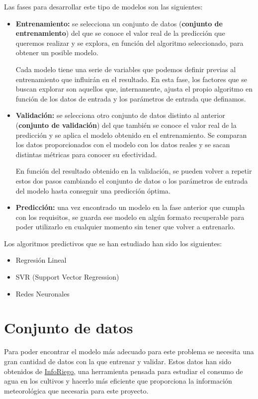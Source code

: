 Las fases para desarrollar este tipo de modelos son las siguientes:
\begin{itemize}
\item \textbf{Entrenamiento:} se selecciona un conjunto de datos (\textbf{conjunto de entrenamiento}) del que se conoce el valor real de la predicción que queremos realizar y se explora, en función del algoritmo seleccionado, para obtener un posible modelo.

Cada modelo tiene una serie de variables que podemos definir previas al entrenamiento que influirán en el resultado. En esta fase, los factores que se buscan explorar son aquellos que, internamente, ajusta el propio algoritmo en función de los datos de entrada y los parámetros de entrada que definamos.

\item \textbf{Validación:} se selecciona otro conjunto de datos distinto al anterior (\textbf{conjunto de validación}) del que también se conoce el valor real de la predicción y se aplica el modelo obtenido en el entrenamiento. Se comparan los datos proporcionados con el modelo con los datos reales y se sacan distintas métricas para conocer su efectividad. 

En función del resultado obtenido en la validación, se pueden volver a repetir estos dos pasos cambiando el conjunto de datos o los parámetros de entrada del modelo hasta conseguir una predicción óptima.

\item \textbf{Predicción:} una vez encontrado un modelo en la fase anterior que cumpla con los requisitos, se guarda ese modelo en algún formato recuperable para poder utilizarlo en cualquier momento sin tener que volver a entrenarlo.
\end{itemize}

Los algoritmos predictivos que se han estudiado han sido los siguientes:

	\begin{itemize}
	\item Regresión Lineal
	\item SVR (Support Vector Regression)
	\item Redes Neuronales
\end{itemize}

\section{Conjunto de datos}
\label{makereference4.2}

Para poder encontrar el modelo más adecuado para este problema se necesita una gran cantidad de datos con la que entrenar y validar. Estos datos han sido obtenidos de \href{http://www.inforiego.org/opencms/opencms}{InfoRiego}, una herramienta pensada para estudiar el consumo de agua en los cultivos y hacerlo más eficiente que proporciona la información meteorológica que necesaria para este proyecto.

